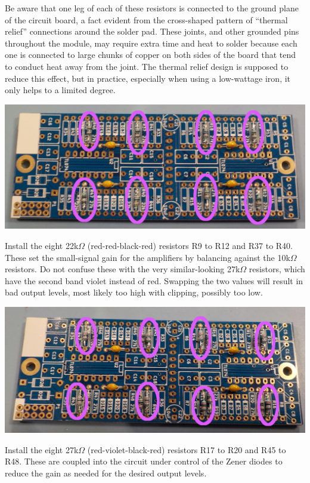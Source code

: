 Be aware that one leg of each of these resistors is connected to the ground
plane of the circuit board, a fact evident from the cross-shaped pattern of
``thermal relief'' connections around the solder pad.  These joints, and
other grounded pins throughout the module, may require extra time and heat
to solder because each one is connected to large chunks of copper on both
sides of the board that tend to conduct heat away from the joint.  The
thermal relief design is supposed to reduce this effect, but in practice,
especially when using a low-wattage iron, it only helps to a limited degree.

\noindent\includegraphics[width=\linewidth]{res-10k.jpg}

Install the eight 22k$\Omega$ (red-red-black-red) resistors R9 to R12 and
R37 to R40.  These set the small-signal gain for the amplifiers by balancing
against the 10k$\Omega$ resistors.  Do not confuse these with the very
similar-looking 27k$\Omega$ resistors, which have the second band violet
instead of red.  Swapping the two values will result in bad output levels,
most likely too high with clipping, possibly too low.

\noindent\includegraphics[width=\linewidth]{res-22k.jpg}

Install the eight 27k$\Omega$ (red-violet-black-red) resistors R17 to R20
and R45 to R48.  These are coupled into the circuit under control of the
Zener diodes to reduce the gain as needed for the desired output levels.

